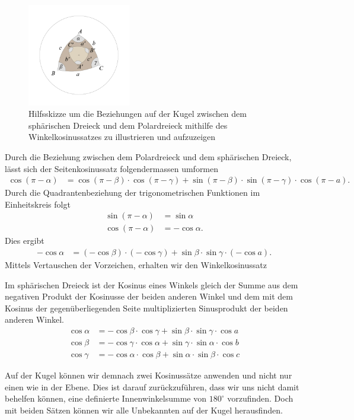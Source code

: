 \begin{refsection}
\begin{figure}[htbp]
\centering
\includegraphics[width=0.4\textwidth]{kugel/PolarWinkelkosinus.jpg}
\caption{Hilfsskizze um die Beziehungen auf der Kugel zwischen dem
sphärischen Dreieck und dem Polardreieck mithilfe des Winkelkosinussatzes
zu illustrieren und aufzuzeigen}
\end{figure}

Durch die Beziehung zwischen dem Polardreieck und dem sphärischen
Dreieck, lässt sich der Seitenkosinussatz folgendermassen umformen
\begin{align*}
{\cos (\pi-\alpha)} &= {\cos (\pi-\beta)} \cdot {\cos (\pi-\gamma)} + {\sin(\pi-\beta)} \cdot {\sin(\pi-\gamma)} \cdot {\cos (\pi-a)}.
\end{align*}
Durch die Quadrantenbeziehung der trigonometrischen Funktionen im
Einheitskreis folgt
\begin{align*}
\sin (\pi-\alpha) &= \sin \alpha\\
\cos (\pi-\alpha) &= - \cos \alpha.
\end{align*}
Dies ergibt
\begin{align*}
{-\cos \alpha} &= {(-\cos \beta)} \cdot {(-\cos \gamma)} + {\sin \beta} \cdot {\sin \gamma} \cdot {(-\cos a)}.
\end{align*}
Mittels Vertauschen der Vorzeichen, erhalten wir den Winkelkosinussatz

\begin{satz}
Im sphärischen Dreieck ist der Kosinus eines Winkels gleich der
Summe aus dem negativen Produkt der Kosinusse der beiden anderen
Winkel und dem mit dem Kosinus der gegenüberliegenden Seite
multiplizierten Sinusprodukt der beiden anderen Winkel.
\begin{align*}
{\cos \alpha} &= {-\cos \beta} \cdot {\cos \gamma} + {\sin \beta} \cdot {\sin \gamma} \cdot {\cos a}\\
{\cos \beta} &= {-\cos \gamma} \cdot {\cos \alpha} + {\sin \gamma} \cdot {\sin \alpha} \cdot {\cos b}\\
{\cos \gamma} &= {-\cos \alpha} \cdot {\cos \beta} + {\sin \alpha} \cdot {\sin \beta} \cdot {\cos c}
\end{align*}
\label{skript:kugel:satz:Winkelkosinussatz}
\end{satz}
%
Auf der Kugel können wir demnach zwei Kosinussätze anwenden und
nicht nur einen wie in der Ebene. Dies ist darauf zurückzuführen,
dass wir uns nicht damit behelfen können, eine definierte
Innenwinkelsumme von $180^{\circ}$ vorzufinden. Doch mit beiden
Sätzen können wir alle Unbekannten auf der Kugel herausfinden.


\end{refsection}
